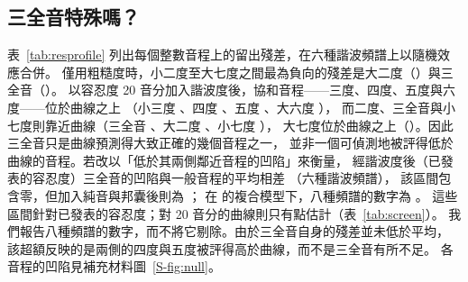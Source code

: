 \documentclass[11pt,a4paper]{article}
\begin{document}
\subsection{三全音特殊嗎？}
\label{sec:special}
表~\ref{tab:resprofile} 列出每個整數音程上的留出殘差，在六種諧波頻譜上以隨機效應合併。
僅用粗糙度時，小二度至大七度之間最為負向的殘差是大二度（\rpfMajSecHK）與三全音（\rpfSixHK）。
以容忍度 20 音分加入諧波度後，協和音程——三度、四度、五度與六度——位於曲線之上
（小三度 \rpfMinThirdTw、四度 \rpfFourthTw、五度 \rpfFifthTw、大六度 \rpfMajSixthTw），
而二度、三全音與小七度則靠近曲線（三全音 \rpfSixTw、大二度 \rpfMajSecTw、小七度 \rpfMinSevTw），
大七度位於曲線之上（\rpfMajSevTw）。因此三全音只是曲線預測得大致正確的幾個音程之一，
並非一個可偵測地被評得低於曲線的音程。若改以「低於其兩側鄰近音程的凹陷」來衡量，
經諧波度後（已發表的容忍度）三全音的凹陷與一般音程的平均相差 \ttoHKHHarm{} \ttoHKHHarmCI{}（六種諧波頻譜），
該區間包含零，但加入純音與邦囊後則為 \ttoHKHEight{} \ttoHKHEightCI；
在 \citet{marjieh2024} 的複合模型下，八種頻譜的數字為 \ttoCompEight{} \ttoCompEightCI。
這些區間針對已發表的容忍度；對 20 音分的曲線則只有點估計（表~\ref{tab:screen}）。
我們報告八種頻譜的數字，而不將它剔除。由於三全音自身的殘差並未低於平均，
該超額反映的是兩側的四度與五度被評得高於曲線，而不是三全音有所不足。
各音程的凹陷見補充材料圖~\ref{S-fig:null}。

\begin{table}[t]
\centering
\caption{每個整數音程上的留出殘差（觀測值 $-$ 預測值），六種諧波美國頻譜上的隨機效應，單位為 SD。
$^*$Hartung--Knapp 信賴區間排除零。Size：音程大小的線性項（第~\ref{sec:ceiling}~節）。
（欄標中的 m2、M2、m3、M3、P4、TT、P5、m6、M6、m7、M7、P8、m9、M9 依序為小二度、大二度、小三度、大三度、
純四度、三全音、純五度、小六度、大六度、小七度、大七度、八度、小九度、大九度。）}
\label{tab:resprofile}
\scriptsize
\setlength{\tabcolsep}{2pt}
\end{table}
\end{document}

